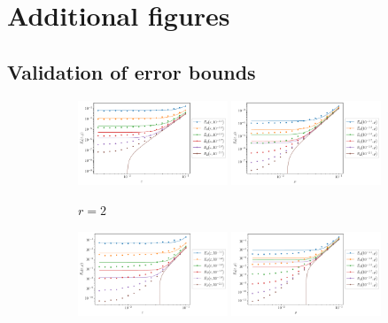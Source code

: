 \chapter{Additional figures}


\section{Validation of error bounds}\label{app:extra_paper_plots}


\begin{figure}
	\begin{center}
		\begin{subfigure}{\textwidth}
			\includegraphics[width=0.49\textwidth]{chp04_paper_numerics/figures/sine/str_err_eps_r_2.0_log.pdf}
			\includegraphics[width=0.49\textwidth]{chp04_paper_numerics/figures/sine/str_err_rho_r_2.0_log.pdf}
			\caption{\(r = 2\)}
		\end{subfigure}
		\begin{subfigure}{\textwidth}
			\includegraphics[width=0.49\textwidth]{chp04_paper_numerics/figures/sine/str_err_eps_r_3.0_log.pdf}
			\includegraphics[width=0.49\textwidth]{chp04_paper_numerics/figures/sine/str_err_rho_r_3.0_log.pdf}

\end{subfigure}
\end{center}
\end{figure}
